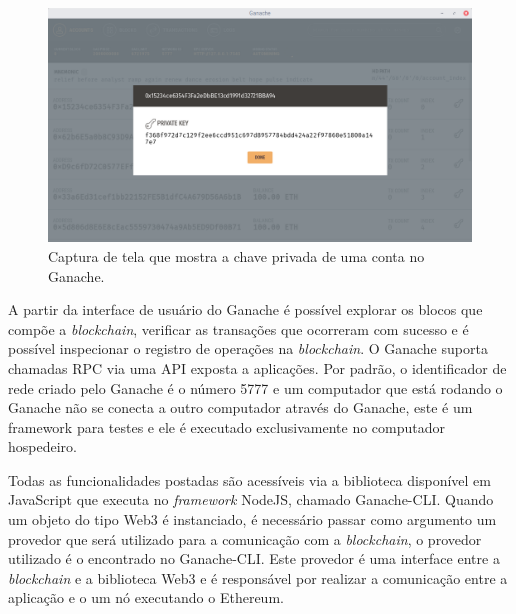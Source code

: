 \documentclass[tcc,capa]{texufpel}
\begin{document}
    \begin{figure}[h!]
        \centering
        \includegraphics[width=15cm]{imagens/ganache-senha.png}
        \caption{Captura de tela que mostra a chave privada de uma conta no Ganache.}
        \label{fig:screenshot-senha-ganache}
    \end{figure}
    
    A partir da interface de usuário do Ganache é possível explorar os blocos que compõe a \textit{blockchain}, verificar as transações que ocorreram com sucesso e é possível inspecionar o registro de operações na \textit{blockchain}. O Ganache suporta chamadas RPC via uma API exposta a aplicações. Por padrão, o identificador de rede criado pelo Ganache é o número 5777 e um computador que está rodando o Ganache não se conecta a outro computador através do Ganache, este é um framework para testes e ele é executado exclusivamente no computador hospedeiro.
    
    Todas as funcionalidades postadas são acessíveis via a biblioteca disponível em JavaScript que executa no \textit{framework} NodeJS, chamado Ganache-CLI. Quando um objeto do tipo Web3 é instanciado, é necessário passar como argumento um provedor que será utilizado para a comunicação com a \textit{blockchain}, o provedor utilizado é o encontrado no Ganache-CLI. Este provedor é uma interface entre a \textit{blockchain} e a biblioteca Web3 e é responsável por realizar a comunicação entre a aplicação e o um nó executando o Ethereum.
    
    
\end{document}

